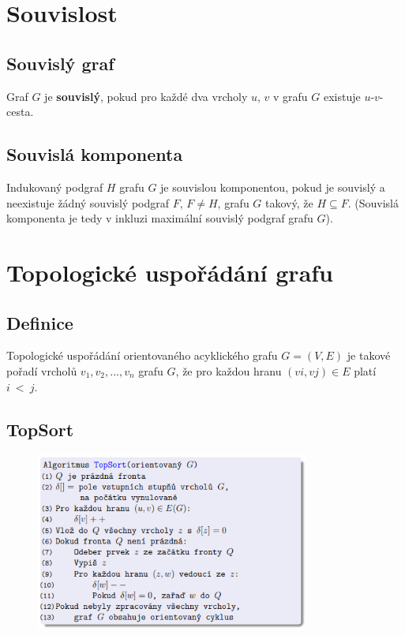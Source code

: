 \documentclass{szzclass}
\begin{document}
\section{Souvislost}
\subsection{Souvislý graf}
Graf $G$ je \textbf{souvislý}, pokud pro každé dva vrcholy $u$, $v$ v grafu $G$ existuje $u$-$v$-cesta.

\subsection{Souvislá komponenta}
Indukovaný podgraf $H$ grafu $G$ je souvislou komponentou, pokud je souvislý a neexistuje žádný souvislý podgraf $F$, $F \neq H$, grafu $G$ takový, že $H \subseteq F$.
(Souvislá komponenta je tedy v inkluzi maximální souvislý podgraf grafu $G$).

\section{Topologické uspořádání grafu}
\subsection{Definice}
Topologické uspořádání orientovaného acyklického grafu $G = (V, E)$ je takové pořadí vrcholů $v_1, v_2, . . . , v_n$ grafu $G$, že pro každou hranu $(vi, vj) \in E$ platí $i~<~j$.

\subsection{TopSort}
\begin{figure}[h!]
\includegraphics[width=0.8\textwidth]{topics/bi-spol-4/images/topSort.png}
\end{figure}
\end{document}
